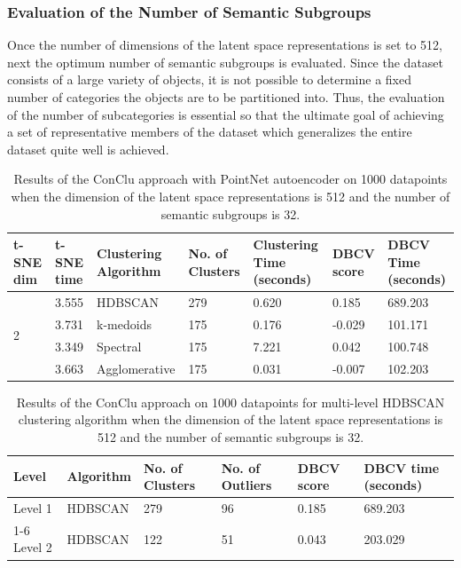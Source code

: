 \subsubsection{Evaluation of the Number of Semantic Subgroups}
\label{sec:conclu_pointnet_semantic}
Once the number of dimensions of the latent space representations is set to 512, next the optimum number of semantic subgroups is evaluated. Since the dataset consists of a large variety of objects, it is not possible to determine a fixed number of categories the objects are to be partitioned into. Thus, the evaluation of the number of subcategories is essential so that the ultimate goal of achieving a set of representative members of the dataset which generalizes the entire dataset quite well is achieved. 

\begin{table}[H]
  \setlength\extrarowheight{10pt}
  \caption{Results of the ConClu approach with PointNet autoencoder on 1000 datapoints when the dimension of the latent space representations is 512 and the number of semantic subgroups is 32. }
  \centering
  \begin{tabular}{|p{30pt}|p{50pt}|p{60pt}|p{50pt}|p{50pt}|p{50pt}|p{40pt}|}
    \toprule
    \ac{t-SNE} dim	& \ac{t-SNE} time & Clustering Algorithm & No. of Clusters & Clustering Time (seconds) & \ac{DBCV} score & \ac{DBCV} Time (seconds)\\
    \midrule
    \multirow{4}{30pt}{2}	& 3.555 & \ac{HDBSCAN}	& 279	& 0.620 & 0.185	& 689.203 \\ \cline{2-7} 
    & 3.731 & k-medoids	& 175	& 0.176 & -0.029	& 101.171 \\ \cline{2-7} 
    & 3.349 & Spectral	& 175	& 7.221 & 0.042 	& 100.748 \\ \cline{2-7}
    & 3.663 & Agglomerative	& 175	& 0.031 & -0.007	& 102.203 \\ 
    \bottomrule
  \end{tabular}
  \label{tab:conclu_k_32}
\end{table}

\begin{table}[H]
  \setlength\extrarowheight{10pt}
  \caption{Results of the ConClu approach on 1000 datapoints for multi-level \ac{HDBSCAN} clustering algorithm when the dimension of the latent space representations is 512 and the number of semantic subgroups is 32. }
  \centering
  \begin{tabular}{|l|l|l|l|l|l|}
    \toprule
    Level & Algorithm	& No. of Clusters	& No. of Outliers	& DBCV score	& \ac{DBCV} time (seconds)	\\  
    \midrule
    Level 1 & \ac{HDBSCAN} & 279	& 96	& 0.185	& 689.203 \\ \cline{1-6}
    Level 2 & \ac{HDBSCAN}	& 122	& 51	& 0.043	& 203.029 \\ 
    \bottomrule
  \end{tabular}
  \label{tab:conclu_k_32_levels}
\end{table}

